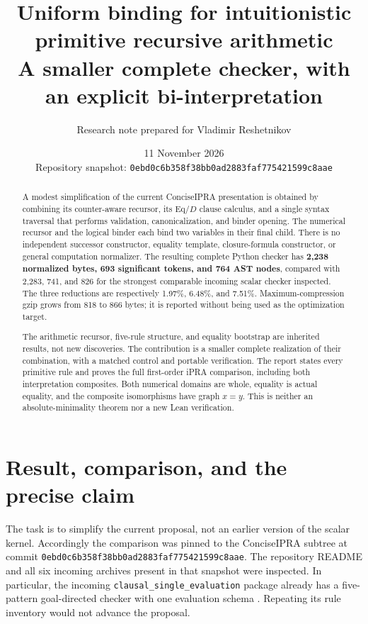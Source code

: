\documentclass[10pt,letterpaper]{article}
\title{\vspace{-1.3em}\textbf{Uniform binding for intuitionistic\\primitive recursive arithmetic}\\[0.4em]
 \large A smaller complete checker, with an explicit bi-interpretation}
\author{Research note prepared for Vladimir Reshetnikov}
\date{11 November 2026\\\small Repository snapshot: \texttt{0ebd0c6b358f38bb0ad2883faf775421599c8aae}}
\theoremstyle{definition}
\theoremstyle{remark}
\begin{document}
\maketitle
\begin{abstract}
A modest simplification of the current ConciseIPRA presentation is obtained
by combining its counter-aware recursor, its Eq/$D$ clause calculus, and
a single syntax traversal that performs validation, canonicalization, and
binder opening. The numerical recursor and the logical binder each bind
two variables in their final child. There is no independent successor
constructor, equality template, closure-formula constructor, or general
computation normalizer. The resulting complete Python checker has
\textbf{2,238 normalized bytes, 693 significant tokens, and 764 AST nodes},
compared with 2,283, 741, and 826 for the strongest comparable incoming
scalar checker inspected. The three reductions are respectively
1.97\%, 6.48\%, and 7.51\%. Maximum-compression gzip grows from 818 to 866
bytes; it is reported without being used as the optimization target.

The arithmetic recursor, five-rule structure, and equality bootstrap are
inherited results, not new discoveries. The contribution is a smaller
complete realization of their combination, with a matched control and
portable verification. The report states every primitive rule and proves
the full first-order iPRA comparison, including both interpretation
composites. Both numerical domains are whole, equality is actual equality,
and the composite isomorphisms have graph $x=y$. This is neither an
absolute-minimality theorem nor a new Lean verification.
\end{abstract}

\section{Result, comparison, and the precise claim}

The task is to simplify the current proposal, not an earlier version of
the scalar kernel. Accordingly the comparison was pinned to the
ConciseIPRA subtree at commit
\texttt{0ebd0c6b358f38bb0ad2883faf775421599c8aae}.
The repository README and all six incoming archives present in that
snapshot were inspected. In particular, the incoming
\texttt{clausal\_single\_evaluation} package already has a five-pattern
goal-directed checker with one evaluation schema \cite{snapshot,single}.
Repeating its rule inventory would not advance the proposal.
\end{document}
